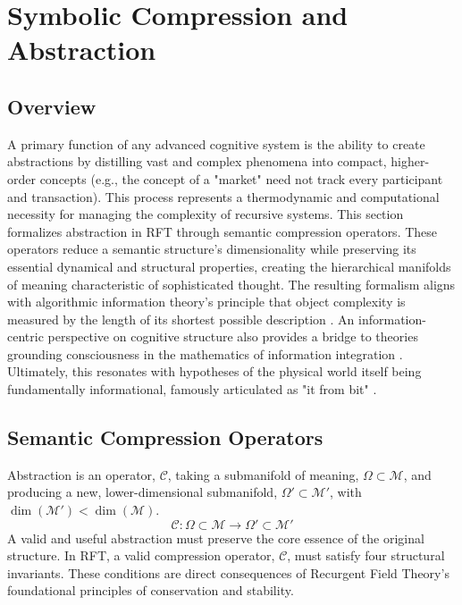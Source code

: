 \chapter{Symbolic Compression and Abstraction}

\section{Overview}

A primary function of any advanced cognitive system is the ability to create abstractions by distilling vast and complex phenomena into compact, higher-order concepts (e.g., the concept of a "market" need not track every participant and transaction). This process represents a thermodynamic and computational necessity for managing the complexity of recursive systems. This section formalizes abstraction in RFT through semantic compression operators. These operators reduce a semantic structure's dimensionality while preserving its essential dynamical and structural properties, creating the hierarchical manifolds of meaning characteristic of sophisticated thought. The resulting formalism aligns with algorithmic information theory's principle that object complexity is measured by the length of its shortest possible description \autocite{Kolmogorov1965, Chaitin1966}. An information-centric perspective on cognitive structure also provides a bridge to theories grounding consciousness in the mathematics of information integration \autocite{Tononi2004}. Ultimately, this resonates with hypotheses of the physical world itself being fundamentally informational, famously articulated as "it from bit" \autocite{Wheeler1990}.

\section{Semantic Compression Operators}

Abstraction is an operator, \(\mathcal{C}\), taking a submanifold of meaning, \(\Omega \subset \mathcal{M}\), and producing a new, lower-dimensional submanifold, \(\Omega' \subset \mathcal{M}'\), with \(\dim(\mathcal{M}') < \dim(\mathcal{M})\).
\begin{equation}
\mathcal{C}: \Omega \subset \mathcal{M} \longrightarrow \Omega' \subset \mathcal{M}'
\end{equation}
A valid and useful abstraction must preserve the core essence of the original structure. In RFT, a valid compression operator, \(\mathcal{C}\), must satisfy four structural invariants. These conditions are direct consequences of Recurgent Field Theory's foundational principles of conservation and stability.

